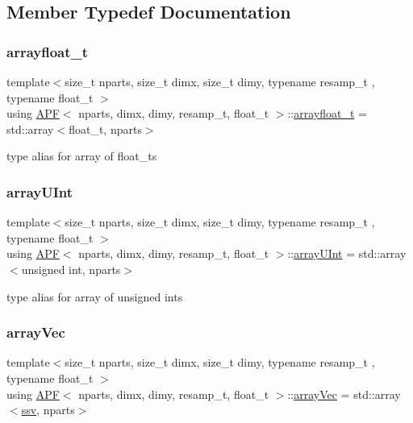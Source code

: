 \subsection{Member Typedef Documentation}
\mbox{\label{classAPF_ac686d94dd5c9f06febed3508dad43520}} 
\subsubsection{\texorpdfstring{arrayfloat\+\_\+t}{arrayfloat\_t}}
{\footnotesize\ttfamily template$<$size\+\_\+t nparts, size\+\_\+t dimx, size\+\_\+t dimy, typename resamp\+\_\+t , typename float\+\_\+t $>$ \\
using \hyperlink{classAPF}{A\+PF}$<$ nparts, dimx, dimy, resamp\+\_\+t, float\+\_\+t $>$\+::\hyperlink{classAPF_ac686d94dd5c9f06febed3508dad43520}{arrayfloat\+\_\+t} =  std\+::array$<$float\+\_\+t, nparts$>$}

type alias for array of float\+\_\+ts \mbox{\label{classAPF_a18fed7b33bf9dbb0e3a78b87d1e75272}} 
\subsubsection{\texorpdfstring{array\+U\+Int}{arrayUInt}}
{\footnotesize\ttfamily template$<$size\+\_\+t nparts, size\+\_\+t dimx, size\+\_\+t dimy, typename resamp\+\_\+t , typename float\+\_\+t $>$ \\
using \hyperlink{classAPF}{A\+PF}$<$ nparts, dimx, dimy, resamp\+\_\+t, float\+\_\+t $>$\+::\hyperlink{classAPF_a18fed7b33bf9dbb0e3a78b87d1e75272}{array\+U\+Int} =  std\+::array$<$unsigned int, nparts$>$}

type alias for array of unsigned ints \mbox{\label{classAPF_af0e0643ea340705993c12b1aa7ad0f4d}} 
\subsubsection{\texorpdfstring{array\+Vec}{arrayVec}}
{\footnotesize\ttfamily template$<$size\+\_\+t nparts, size\+\_\+t dimx, size\+\_\+t dimy, typename resamp\+\_\+t , typename float\+\_\+t $>$ \\
using \hyperlink{classAPF}{A\+PF}$<$ nparts, dimx, dimy, resamp\+\_\+t, float\+\_\+t $>$\+::\hyperlink{classAPF_af0e0643ea340705993c12b1aa7ad0f4d}{array\+Vec} =  std\+::array$<$\hyperlink{classAPF_a5f96da87f00ff75af1232f9021daf06a}{ssv}, nparts$>$}

